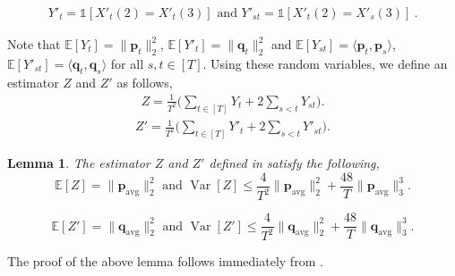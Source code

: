 \documentclass[10pt]{article} %
\newcommand{\E}{\mathbb{E}}
\theoremstyle{plain}
\newtheorem{lemma}[theorem]{Lemma}
\newcommand{\bp}{\textbf{p}}
\newcommand{\bq}{\textbf{q}}
\newcommand{\avg}{\mathrm{avg}}
\newcommand{\Var}{\operatorname{{Var}}}
\begin{document}
\begin{align*}
	Y'_{t} = \mathds{1}[X'_t(2) = X'_t(3)] \text{ and }
	Y'_{st} = \mathds{1}[X'_t(2) = X'_s(3)]~.
\end{align*}



Note that $\E[Y_{t}]=\|\bp_t\|^2_2$, $\E[Y'_{t}]=\|\bq_t\|^2_2$ and  $\E[Y_{st}]=\langle \bp_t, \bp_{s} \rangle$, $\E[Y'_{st}]=\langle \bq_t, \bq_{s} \rangle$ for all $s,t\in [T]$. Using these random variables, we define an estimator $Z$ and $Z'$ as follows,
\begin{align*}
	Z = \frac{1}{T^2}\Big(\sum_{t \in [T]}Y_{t} + 2\sum_{s < t}Y_{st}\Big).
\end{align*}
\begin{align*}
	Z' = \frac{1}{T^2}\Big(\sum_{t \in [T]}Y'_{t} + 2\sum_{s < t}Y'_{st}\Big).
\end{align*}


\begin{lemma}\label{lem:zzz}
	The estimator $Z$ and $Z'$ defined in  satisfy the following,
	$$\E[Z] = \|\bp_{\avg}\|^2_2 \text{ and }\Var[Z] \leq \frac{4}{T^2}\Big\| \bp_{\avg} \Big\|^2_2 + \frac{48}{T}\Big\| \bp_{\avg}\Big\|^3_3.$$
	
	$$\E[Z'] = \|\bq_{\avg}\|^2_2 \text{ and }\Var[Z'] \leq \frac{4}{T^2}\Big\| \bq_{\avg} \Big\|^2_2 + \frac{48}{T}\Big\| \bq_{\avg}\Big\|^3_3.$$
\end{lemma}
The proof of the above lemma follows immediately from .
\end{document}
